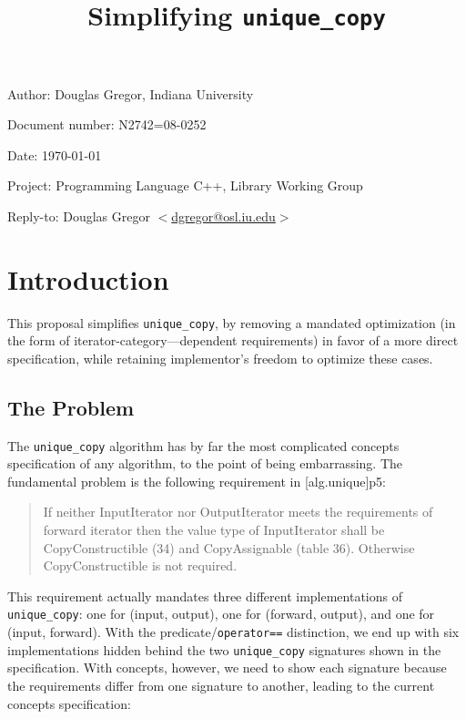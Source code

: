 \documentclass[american]{article}
\newcommand{\code}[1]{\lstinline[basicstyle=\sffamily,keywords={}]{#1}}
\newcommand{\tcode}[1]{\code{#1}}
\begin{document}
\pagestyle{myheadings}

\title{Simplifying \tcode{unique_copy}}
\author{}

\date{}
\maketitle
\vspace{-0.5in}
\par\noindent Author: Douglas Gregor, Indiana University
\par\noindent Document number: N2742=08-0252
\par\noindent Date: \today
\par\noindent Project: Programming Language C++, Library Working Group
\par\noindent Reply-to: Douglas Gregor $<$\href{mailto:dgregor@osl.iu.edu}{dgregor@osl.iu.edu}$>$

\section{Introduction}
This proposal simplifies \tcode{unique_copy}, by removing a mandated
optimization (in the form of iterator-category---dependent requirements)
in favor of a more direct specification, while retaining implementor's
freedom to optimize these cases.

\subsection{The Problem}
The \tcode{unique_copy} algorithm has by far the most complicated
concepts specification of any algorithm, to the point of being
embarrassing. The fundamental problem is
the following requirement in [alg.unique]p5:

\begin{quote}
  If neither InputIterator nor OutputIterator meets the requirements
  of forward iterator then the value type of InputIterator shall be
  CopyConstructible (34) and CopyAssignable (table 36). Otherwise
  CopyConstructible is not required.
\end{quote}

This requirement actually mandates three different implementations of
\tcode{unique_copy}: one for (input, output), one for (forward,
output), and one for (input, forward). With the
predicate/\tcode{operator==} distinction, we end up with six
implementations hidden behind the two \tcode{unique_copy} signatures
shown in the specification. With concepts, however, we need to show
each signature because the requirements differ from one signature to
another, leading to the current concepts specification:
\end{document}
